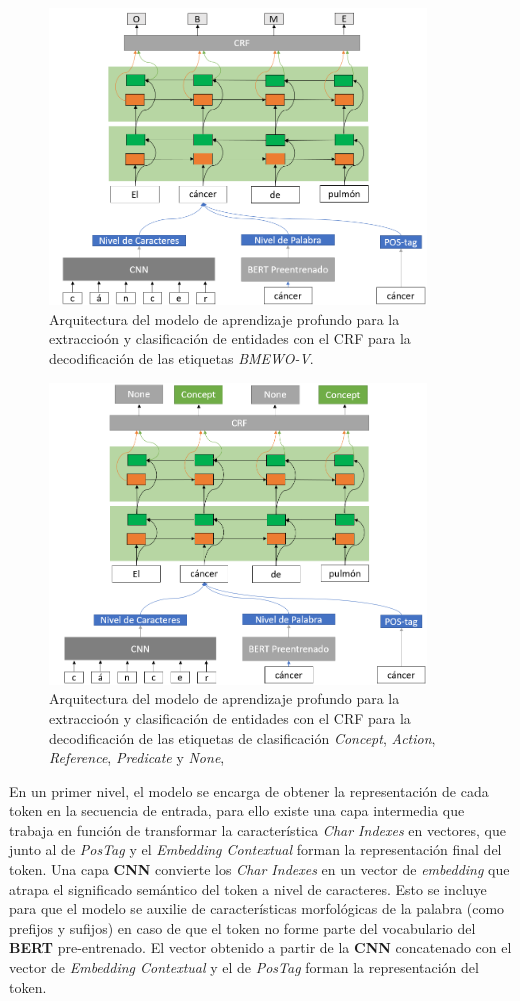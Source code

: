 \begin{figure}[h!]
	\centering
	\includegraphics[width = 10cm]{Imagenes/EntitiesModelRec.png}
	\caption{Arquitectura del modelo de aprendizaje profundo para la extraccio\'on y clasificaci\'on de entidades con el CRF para la decodificaci\'on de las etiquetas \emph{BMEWO-V}.}\label{fig:ArcMod}
\end{figure}

\begin{figure}[h!]
	\centering
	\includegraphics[width = 10cm]{Imagenes/EntitiesModelClas.png}
	\caption{Arquitectura del modelo de aprendizaje profundo para la extraccio\'on y clasificaci\'on de entidades con el CRF para la decodificaci\'on de las etiquetas de clasificaci\'on \emph{Concept}, \emph{Action}, \emph{Reference}, \emph{Predicate} y \emph{None},}\label{fig:ArcMod}
\end{figure}

En un primer nivel, el modelo se encarga de obtener la representaci\'on de cada token en la secuencia de entrada, para ello existe una capa intermedia que trabaja en funci\'on de transformar la caracter\'istica \emph{Char Indexes} en vectores, que junto al de \emph{PosTag} y el \emph{Embedding Contextual} forman la representaci\'on final del token. Una capa \textbf{CNN} convierte los \emph{Char Indexes} en un vector de \emph{embedding} que atrapa el significado sem\'antico del token a nivel de caracteres. Esto se incluye para que el modelo se auxilie de caracter\'isticas morfol\'ogicas de la palabra (como prefijos y sufijos) en caso de que el token no forme parte del vocabulario del \textbf{BERT} pre-entrenado. El vector obtenido a partir de la \textbf{CNN} concatenado con el vector de \emph{Embedding Contextual} y el de \emph{PosTag} forman la representaci\'on del token.

